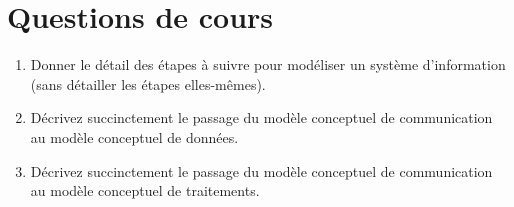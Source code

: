 \section*{Questions de cours}

\begin{enumerate}
	\item Donner le détail des étapes à suivre pour modéliser un système d'information (sans détailler les étapes elles-mêmes).
	\item Décrivez succinctement le passage du modèle conceptuel de communication au modèle conceptuel de données.
	\item Décrivez succinctement le passage du modèle conceptuel de communication au modèle conceptuel de traitements.
\end{enumerate}
